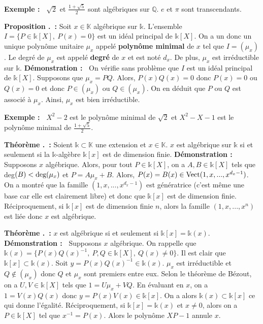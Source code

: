 \documentclass[5pt,a4paper]{article}
\newcounter{prop}[section]
\newcounter{thm}[section]
\renewcommand{\theprop}{\thesection.\arabic{prop}}
\renewcommand{\thethm}{\thesection.\arabic{thm}}
\newcommand{\prop}[1]{\stepcounter{prop}\noindent\textbf{Proposition \theprop ~:} #1 \newline}
\newcommand{\thm}[1]{\stepcounter{thm}\noindent\textbf{Théorème \thethm ~:} #1 \newline}
\newcommand{\demo}[1]{\textbf{Démonstration :~} #1 \newline}
\newcommand{\ex}[1]{\textbf{Exemple :~} #1 \newline}
\begin{document}
\begin{onehalfspacing}
\ex{$\sqrt{2}$ et $\frac{1 + \sqrt{5}}{2}$ sont algébriques sur $\mathbb{Q}$. $e$ et $\pi$ sont transcendants.}


\prop{Soit $x \in \mathbb{K}$ algébrique sur $\mathds{k}$. L'ensemble $I = \{P \in \mathds{k}[X],~P(x) = 0\}$ est un idéal principal de $\mathds{k}[X]$. On a un donc un unique polynôme unitaire $\mu_x$ appelé \textbf{polynôme minimal} de $x$ tel que $I = (\mu_x)$. Le degré de $\mu_x$ est appelé \textbf{degré} de $x$ et est noté $d_x$. De plus, $\mu_x$ est irréductible sur $\mathds{k}$.}
\demo{On vérifie sans problème que $I$ est un idéal principal de $\mathds{k}[X]$. Supposons que $\mu_x = PQ$. Alors, $P(x)Q(x) = 0$ donc $P(x) = 0$ ou $Q(x) = 0$ et donc $P \in (\mu_x)$ ou $Q \in (\mu_x)$. On en déduit que $P$ ou $Q$ est associé à $\mu_x$. Ainsi, $\mu_x$ est bien irréductible.}


\ex{$X^2 - 2$ est le polynôme minimal de $\sqrt{2}$ et $X^2 - X - 1$ est le polynôme minimal de $\frac{1+\sqrt{5}}{2}$.}


\thm{Soient $\mathds{k} \subset \mathbb{K}$ une extension et $x \in \mathbb{K}$. $x$ est algébrique sur $\mathds{k}$ si et seulement si la $\mathds{k}$-algèbre $\mathds{k}[x]$ est de dimension finie.}
\demo{Supposons $x$ algébrique. Alors, pour tout $P \in \mathds{k}[X]$, on a $A, B \in \mathds{k}[X]$ tels que deg$(B) < \textup{deg}(\mu_x)$ et $P = A\mu_x + B$. Alors, $P(x) = B(x) \in \textup{Vect}(1, x, ..., x^{d_x - 1})$. On a montré que la famille $(1, x, ..., x^{d_x - 1})$ est génératrice (c'est même une base car elle est clairement libre) et donc que $\mathds{k}[x]$ est de dimension finie. Réciproquement, si $\mathds{k}[x]$ est de dimension finie $n$, alors la famille $(1, x, ..., x^n)$ est liée donc $x$ est algébrique.}


\thm{$x$ est algébrique si et seulement si $\mathds{k}[x] = \mathds{k}(x)$.}
\demo{Supposons $x$ algébrique. On rappelle que $\mathds{k}(x) = \{P(x)Q(x)^{-1},~P,Q \in \mathds{k}[X],~Q(x) \neq 0\}$. Il est clair que $\mathds{k}[x] \subset \mathds{k}(x)$. Soit $y = P(x)Q(x)^{-1} \in \mathds{k}(x)$. $\mu_x$ est irréductible et $Q \notin (\mu_x)$ donc $Q$ et $\mu_x$ sont premiers entre eux. Selon le théorème de Bézout, on a $U, V \in \mathds{k}[X]$ tels que $1 = U\mu_x + VQ$. En évaluant en $x$, on a $1 = V(x)Q(x)$ donc $y = P(x)V(x) \in \mathds{k}[x]$. On a alors $\mathds{k}(x) \subset \mathds{k}[x]$ ce qui donne l'égalité. Réciproquement, si $\mathds{k}[x] = \mathds{k}(x)$ et $x \neq 0$, alors on a $P \in \mathds{k}[X]$ tel que $x^{-1} = P(x)$. Alors le polynôme $XP - 1$ annule $x$.}



\end{onehalfspacing}
\end{document}
